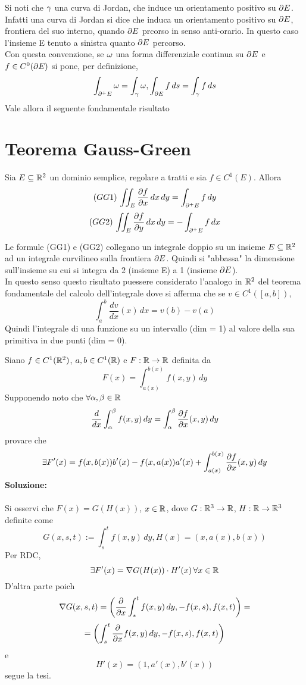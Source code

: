 Si noti che $\gamma$ \ace una curva di Jordan, che induce un orientamento positivo su $\partial E$. \\
Infatti una curva di Jordan si dice che induca un orientamento positivo su $\partial E$, frontiera
del suo interno, quando $\partial E$ \ace prcorso in senso anti-orario. In questo caso 
l'insieme E \ace tenuto a sinistra quanto $\partial E$ \ace percorso. \\
Con questa convenzione, se $\omega$ \ace una forma differenziale continua su $\partial E$ e 
$f\in C^0(\partial E)$ si pone, per definizione, 
$$\int_{\partial^+ E} \omega = \int_{\gamma} \omega , \int_{\partial E} f \, ds = \int_{\gamma} f \, ds$$
Vale allora il seguente fondamentale risultato
\section{Teorema Gauss-Green}
\begin{theorem} 
  \label{gaussgreen}
  Sia $E\subseteq \mathbb{R}^2$ un dominio semplice, regolare a tratti e sia $f\in C^1(E)$. 
  Allora 
  $$(GG1) \, \iint_{E} \frac{\partial f}{\partial x} \,dx\,dy = \int_{\partial^+ E} f \,dy$$
  $$(GG2) \, \iint_{E} \frac{\partial f}{\partial y} \,dx\,dy = -\int_{\partial^+ E} f \,dx$$
\end{theorem}
\begin{osservazione}
  Le formule (GG1) e (GG2) collegano un integrale doppio su un insieme $E\subseteq\mathbb{R}^2$ 
  ad un integrale curvilineo sulla frontiera $\partial E$. Quindi si "abbassa" la
  dimensione sull'insieme su cui si integra da 2 (insieme E) a 1 (insieme $\partial E$). \\
  In questo senso questo risultato pu\aco essere considerato l'analogo in $\mathbb{R}^2$ del 
  teorema fondamentale del calcolo dell'integrale dove si afferma che se 
  $v \in C^1([a,b])$, $$\int_{a}^{b} \frac{dv}{dx}(x)\,dx = v(b)-v(a)$$
  Quindi l'integrale di una funzione su un intervallo (dim = 1) al valore della sua primitiva
  in due punti (dim = 0).
\end{osservazione}
\begin{exercise}
  \label{es41}
  Siano $f\in C^1(\mathbb{R}^2)$, $a,b\in C^1(\mathbb{R})$ e $F:\mathbb{R}\to\mathbb{R}$ definita da 
  $$F(x) = \int_{a(x)}^{b(x)}f(x,y)\,dy$$
  Supponendo noto che $\forall \alpha, \beta \in \mathbb{R}$
  $$\frac{d}{dx}\int_{\alpha}^{\beta} f(x,y)\,dy = \int_{\alpha}^{\beta} \frac{\partial f}{\partial x} (x,y) \, dy$$
  provare che 
  $$\exists F'(x) = f(x,b(x))b'(x) - f(x,a(x))a'(x) + \int_{a(x)}^{b(x)} \frac{\partial f}{\partial x}(x,y)\,dy$$
  \textbf{Soluzione:} \\\\
  Si osservi che $F(x) = G(H(x))$, $x\in\mathbb{R}$, dove $G:\mathbb{R}^3\to\mathbb{R}$, $H:\mathbb{R}\to\mathbb{R}^3$ definite come
  $$G(x,s,t):=\int_{s}^{t} f(x,y)\,dy , H(x) = (x,a(x),b(x))$$
  Per RDC, 
  $$\exists F'(x) = \nabla G(H(x))\cdot H'(x) \, \forall x \in \mathbb{R}$$
  D'altra parte poich\ace
  $$\nabla G(x,s,t) = \left(\frac{\partial}{\partial x} \int_{s}^{t} f(x,y)\,dy, -f(x,s), f(x,t)\right) = $$
  $$= \left(\int_{s}^{t} \frac{\partial}{\partial x}f(x,y)\,dy, -f(x,s), f(x,t)\right)$$
  e $$H'(x) = (1,a'(x),b'(x))$$
  segue la tesi.
\end{exercise}